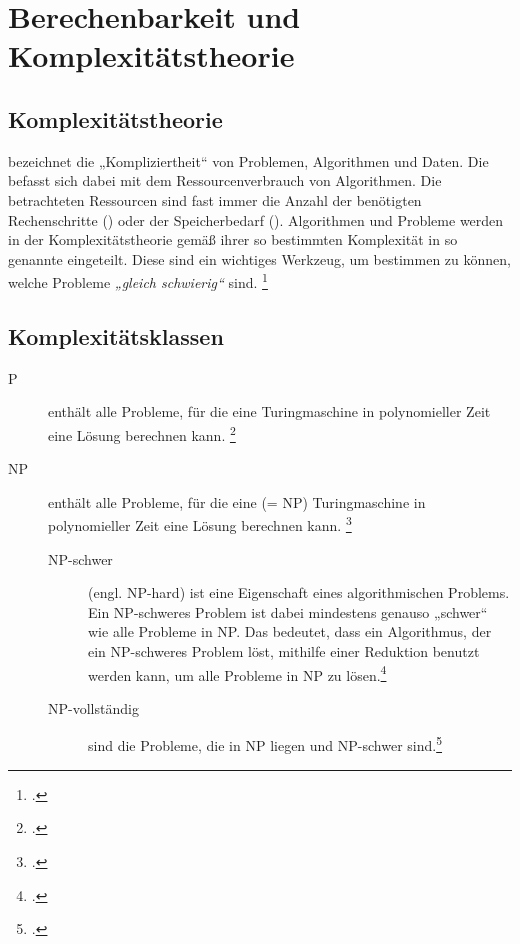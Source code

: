 \documentclass{lehramt-informatik-haupt}
\begin{document}

\chapter{Berechenbarkeit und Komplexitätstheorie}

%

\section{Komplexitätstheorie}

 bezeichnet die „Kompliziertheit“ von Problemen,
Algorithmen und Daten.
%
Die  befasst sich dabei mit dem
Ressourcenverbrauch von Algorithmen.
%
Die betrachteten Ressourcen sind fast immer die Anzahl der
benötigten Rechenschritte () oder der
Speicherbedarf ().
%
Algorithmen und Probleme werden in der Komplexitätstheorie gemäß ihrer
so bestimmten Komplexität in so genannte 
eingeteilt. Diese sind ein wichtiges Werkzeug, um bestimmen zu können,
welche Probleme \emph{„gleich schwierig“} sind.
\footcite[Seite 58]{theo:fs:4}

\section{Komplexitätsklassen}

\begin{description}
\item[P]
enthält alle Probleme, für die eine 
Turingmaschine in polynomieller Zeit eine Lösung berechnen kann.
\footcite[Seite 59]{theo:fs:4}

\item[NP]
enthält alle Probleme, für die eine  (= NP)
Turingmaschine in polynomieller Zeit eine Lösung berechnen kann.
\footcite[Seite 60]{theo:fs:4}

\begin{description}
\item[NP-schwer] (engl. NP-hard) ist eine Eigenschaft eines
algorithmischen Problems. Ein NP-schweres Problem ist dabei mindestens
genauso „schwer“ wie alle Probleme in NP. Das bedeutet, dass ein
Algorithmus, der ein NP-schweres Problem löst, mithilfe einer Reduktion
benutzt werden kann, um alle Probleme in NP zu lösen.\footcite{wiki:np-schwer}

\item[NP-vollständig] sind die Probleme, die in NP liegen
und NP-schwer sind.\footcite{wiki:np-vollstaendig}
\end{description}
\end{description}
\end{document}
